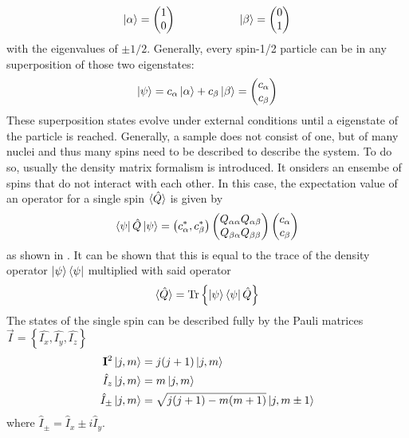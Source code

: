             \begin{equation}
            \ket\alpha = \begin{pmatrix}1\\0\end{pmatrix} \hspace{2 cm} \ket\beta =
            \begin{pmatrix}0\\1\end{pmatrix}
            \end{equation}
            with the eigenvalues of $\pm 1/2$.  Generally, every spin-1/2 particle can be in any superposition of those two eigenstates:
            \begin{equation}
                \ket\psi = c_\alpha \ket\alpha + c_\beta \ket \beta = \begin{pmatrix} c_\alpha \\
                c_\beta\end{pmatrix}
            \end{equation}
            These superposition states evolve under external conditions until a eigenstate of the particle
            is reached. Generally, a sample does not consist of one, but of many nuclei and thus many spins need to be
            described to describe the system. To do so, usually the density matrix formalism is introduced.
            It onsiders an ensembe of spins that do not interact with each other. In this case, the
            expectation value of an operator for a single spin $\braket{\hat Q}$ is given by 
            \begin{equation}
            \bra\psi\hat Q\ket\psi = \left( c_\alpha^*, c_\beta^*\right)
            \begin{pmatrix}
                Q_{\alpha\alpha} Q_{\alpha\beta}\\
                Q_{\beta\alpha} Q_{\beta\beta}
            \end{pmatrix}
            \begin{pmatrix}
                c_\alpha\\
                c_\beta
            \end{pmatrix}
            \end{equation}
            as shown in \cite{sakurai_modern_2017}. It can be shown that this is equal to the trace of the density operator
            $\ket\psi\bra\psi$ multiplied with said operator \cite{levitt_spin_nodate}
            \begin{equation}
                \braket{\hat Q} = \operatorname{Tr} \left\{\ket\psi\bra\psi\hat Q\right\}
            \end{equation}
            The states of the single spin can be described fully by the Pauli matrices $\vec{I} = \left\{ \hat{I_x}, \hat{I_y}, \hat{I_z}\right\}$
            \begin{align*}
                \mathbf{I}^2 \ket{j,m} &= j(j+1)\ket{j,m}\\
                \hat{I}_z \ket{j,m} &= m\ket{j,m}\\
                \hat{I}_\pm \ket{j,m} &= \sqrt{j(j+1)-m(m+1)}\ket{j,m\pm1}
            \end{align*}
            where $ \hat{I}_\pm = \hat{I}_x\pm i \hat{I}_y$.

